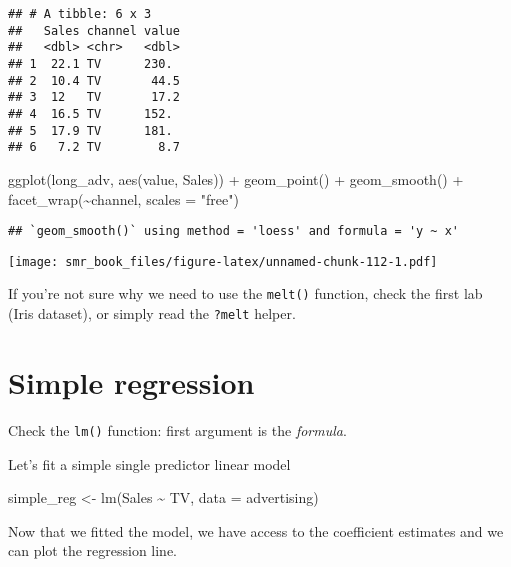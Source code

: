 \documentclass[
  oneside]{book}
\newenvironment{Shaded}{\begin{snugshade}}{\end{snugshade}}
\newcommand{\AttributeTok}[1]{\textcolor[rgb]{0.77,0.63,0.00}{#1}}
\newcommand{\FunctionTok}[1]{\textcolor[rgb]{0.00,0.00,0.00}{#1}}
\newcommand{\NormalTok}[1]{#1}
\newcommand{\OtherTok}[1]{\textcolor[rgb]{0.56,0.35,0.01}{#1}}
\newcommand{\SpecialCharTok}[1]{\textcolor[rgb]{0.00,0.00,0.00}{#1}}
\newcommand{\StringTok}[1]{\textcolor[rgb]{0.31,0.60,0.02}{#1}}
\begin{document}
\begin{verbatim}
## # A tibble: 6 x 3
##   Sales channel value
##   <dbl> <chr>   <dbl>
## 1  22.1 TV      230. 
## 2  10.4 TV       44.5
## 3  12   TV       17.2
## 4  16.5 TV      152. 
## 5  17.9 TV      181. 
## 6   7.2 TV        8.7
\end{verbatim}

\begin{Shaded}
\begin{Highlighting}[]
\FunctionTok{ggplot}\NormalTok{(long\_adv, }\FunctionTok{aes}\NormalTok{(value, Sales)) }\SpecialCharTok{+}
  \FunctionTok{geom\_point}\NormalTok{() }\SpecialCharTok{+}
  \FunctionTok{geom\_smooth}\NormalTok{() }\SpecialCharTok{+}
  \FunctionTok{facet\_wrap}\NormalTok{(}\SpecialCharTok{\textasciitilde{}}\NormalTok{channel, }\AttributeTok{scales =} \StringTok{"free"}\NormalTok{)}
\end{Highlighting}
\end{Shaded}

\begin{verbatim}
## `geom_smooth()` using method = 'loess' and formula = 'y ~ x'
\end{verbatim}

\texttt{[image: smr\_book\_files/figure-latex/unnamed-chunk-112-1.pdf]}

If you're not sure why we need to use the \texttt{melt()} function,
check the first lab (Iris dataset), or simply read the \texttt{?melt}
helper.

\hypertarget{simple-regression}{%
\section{Simple regression}\label{simple-regression}}

Check the \texttt{lm()} function: first argument is the \emph{formula}.

Let's fit a simple single predictor linear model

\begin{Shaded}
\begin{Highlighting}[]
\NormalTok{simple\_reg }\OtherTok{\textless{}{-}} \FunctionTok{lm}\NormalTok{(Sales }\SpecialCharTok{\textasciitilde{}}\NormalTok{ TV, }\AttributeTok{data =}\NormalTok{ advertising)}
\end{Highlighting}
\end{Shaded}

Now that we fitted the model, we have access to the
coefficient estimates and we can plot the regression
line.
\end{document}
